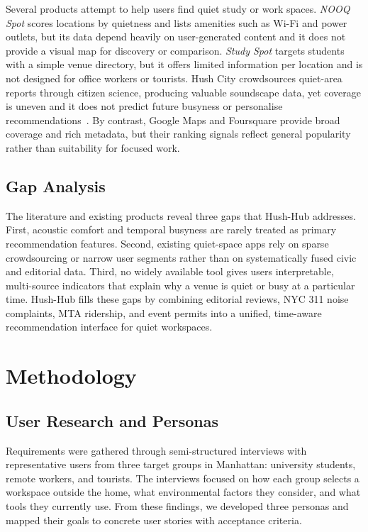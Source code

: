 \documentclass[conference]{IEEEtran}
\begin{document}
Several products attempt to help users find quiet study or work spaces. \textit{NOOQ
Spot} scores locations by quietness and lists amenities such as Wi-Fi and power
outlets, but its data depend heavily on user-generated content and it does not provide a
visual map for discovery or comparison. \textit{Study Spot} targets students with a
simple venue directory, but it offers limited information per location and is not
designed for office workers or tourists. Hush City crowdsources quiet-area reports
through citizen science, producing valuable soundscape data, yet coverage is uneven and
it does not predict future busyness or personalise recommendations~\cite{hushcity}. By
contrast, Google Maps and Foursquare provide broad coverage and rich metadata, but their
ranking signals reflect general popularity rather than suitability for focused work.

\subsection{Gap Analysis}

The literature and existing products reveal three gaps that Hush-Hub addresses. First,
acoustic comfort and temporal busyness are rarely treated as primary recommendation
features. Second, existing quiet-space apps rely on sparse crowdsourcing or narrow user
segments rather than on systematically fused civic and editorial data. Third, no widely
available tool gives users interpretable, multi-source indicators that explain why a
venue is quiet or busy at a particular time. Hush-Hub fills these gaps by combining
editorial reviews, NYC 311 noise complaints, MTA ridership, and event permits into a
unified, time-aware recommendation interface for quiet workspaces.


\section{Methodology}
\label{sec:methodology}

\subsection{User Research and Personas}
\label{sec:userresearch}

Requirements were gathered through semi-structured interviews with representative users from three target groups in Manhattan: university students, remote workers, and tourists. The interviews focused on how each group selects a workspace outside the home, what environmental factors they consider, and what tools they currently use. From these findings, we developed three personas and mapped their goals to concrete user stories with acceptance criteria.
\end{document}
